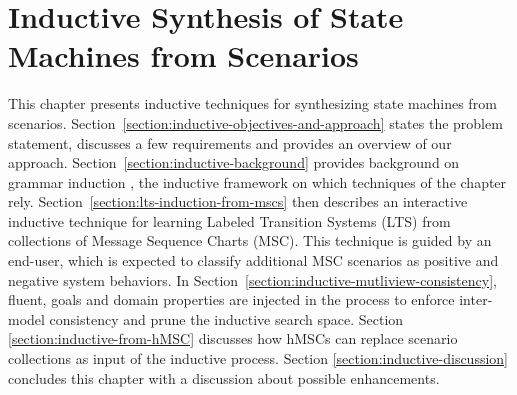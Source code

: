 \chapter{Inductive Synthesis of State Machines from Scenarios\label{chapter:inductive-synthesis}}

This chapter presents inductive techniques for synthesizing state machines from scenarios. Section~\ref{section:inductive-objectives-and-approach} states the problem statement, discusses a few requirements and provides an overview of our approach. Section~\ref{section:inductive-background} provides background on grammar induction \cite{Gold:1978}, the inductive framework on which techniques of the chapter rely. Section~\ref{section:lts-induction-from-mscs} then describes an interactive inductive technique for learning Labeled Transition Systems (LTS) from collections of Message Sequence Charts (MSC). This technique is guided by an end-user, which is expected to classify additional MSC scenarios as positive and negative system behaviors. In Section~\ref{section:inductive-mutliview-consistency}, fluent, goals and domain properties are injected in the process to enforce inter-model consistency and prune the inductive search space. Section \ref{section:inductive-from-hMSC} discusses how hMSCs can replace scenario collections as input of the inductive process. Section \ref{section:inductive-discussion} concludes this chapter with a discussion about possible enhancements. 








